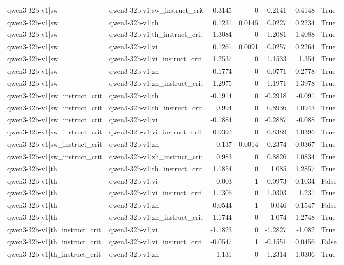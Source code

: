\begin{table}
\begin{tabular}{l l r r r r l}
qwen3-32b-v1|sw & qwen3-32b-v1|sw_instruct_crit & 0.3145 & 0 & 0.2141 & 0.4148 & True \\
qwen3-32b-v1|sw & qwen3-32b-v1|th & 0.1231 & 0.0145 & 0.0227 & 0.2234 & True \\
qwen3-32b-v1|sw & qwen3-32b-v1|th_instruct_crit & 1.3084 & 0 & 1.2081 & 1.4088 & True \\
qwen3-32b-v1|sw & qwen3-32b-v1|vi & 0.1261 & 0.0091 & 0.0257 & 0.2264 & True \\
qwen3-32b-v1|sw & qwen3-32b-v1|vi_instruct_crit & 1.2537 & 0 & 1.1533 & 1.354 & True \\
qwen3-32b-v1|sw & qwen3-32b-v1|zh & 0.1774 & 0 & 0.0771 & 0.2778 & True \\
qwen3-32b-v1|sw & qwen3-32b-v1|zh_instruct_crit & 1.2975 & 0 & 1.1971 & 1.3978 & True \\
qwen3-32b-v1|sw_instruct_crit & qwen3-32b-v1|th & -0.1914 & 0 & -0.2918 & -0.091 & True \\
qwen3-32b-v1|sw_instruct_crit & qwen3-32b-v1|th_instruct_crit & 0.994 & 0 & 0.8936 & 1.0943 & True \\
qwen3-32b-v1|sw_instruct_crit & qwen3-32b-v1|vi & -0.1884 & 0 & -0.2887 & -0.088 & True \\
qwen3-32b-v1|sw_instruct_crit & qwen3-32b-v1|vi_instruct_crit & 0.9392 & 0 & 0.8389 & 1.0396 & True \\
qwen3-32b-v1|sw_instruct_crit & qwen3-32b-v1|zh & -0.137 & 0.0014 & -0.2374 & -0.0367 & True \\
qwen3-32b-v1|sw_instruct_crit & qwen3-32b-v1|zh_instruct_crit & 0.983 & 0 & 0.8826 & 1.0834 & True \\
qwen3-32b-v1|th & qwen3-32b-v1|th_instruct_crit & 1.1854 & 0 & 1.085 & 1.2857 & True \\
qwen3-32b-v1|th & qwen3-32b-v1|vi & 0.003 & 1 & -0.0973 & 0.1034 & False \\
qwen3-32b-v1|th & qwen3-32b-v1|vi_instruct_crit & 1.1306 & 0 & 1.0303 & 1.231 & True \\
qwen3-32b-v1|th & qwen3-32b-v1|zh & 0.0544 & 1 & -0.046 & 0.1547 & False \\
qwen3-32b-v1|th & qwen3-32b-v1|zh_instruct_crit & 1.1744 & 0 & 1.074 & 1.2748 & True \\
qwen3-32b-v1|th_instruct_crit & qwen3-32b-v1|vi & -1.1823 & 0 & -1.2827 & -1.082 & True \\
qwen3-32b-v1|th_instruct_crit & qwen3-32b-v1|vi_instruct_crit & -0.0547 & 1 & -0.1551 & 0.0456 & False \\
qwen3-32b-v1|th_instruct_crit & qwen3-32b-v1|zh & -1.131 & 0 & -1.2314 & -1.0306 & True \\

\end{tabular}
\end{table}
